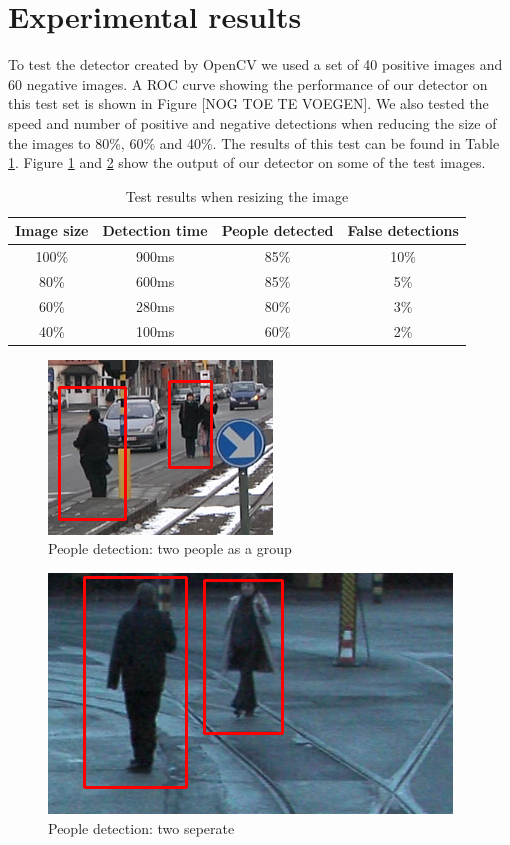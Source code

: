 \documentclass{article}
\begin{document}
\section{Experimental results}
To test the detector created by OpenCV we used a set of 40 positive images and 60 negative images. A ROC curve showing the performance of our detector on this test set is shown in Figure [NOG TOE TE VOEGEN]. We also tested the speed and number of positive and negative detections when reducing the size of the images to 80\%, 60\% and 40\%. The results of this test can be found in Table \ref{table:test}. Figure \ref{fig:pdetection1} and \ref{fig:pdetection2} show the output of our detector on some of the test images.
\begin{table}
    \begin{tabular}{ | c | c | c | c |}
    \hline
    Image size & Detection time & People detected & False detections \\ \hline
    100\%  & 900ms & 85\% & 10\% \\  \hline
    80\%   & 600ms & 85\% & 5\% \\  \hline
    60\%   & 280ms & 80\% & 3\% \\  \hline
    40\%   & 100ms & 60\% & 2\% \\ \hline
    \end{tabular}
    \caption{Test results when resizing the image}
    \label{table:test}
\end{table}
\begin{figure}[h!]
	\centering
	\includegraphics[scale=0.6]{peopledetection1.png}
	\caption{People detection: two people as a group}
	\label{fig:pdetection1}
\end{figure}
\begin{figure}[h!]
	\centering
	\includegraphics[scale=0.4]{peopledetection2.png}
	\caption{People detection: two seperate}
	\label{fig:pdetection2}
\end{figure}
\end{document}

